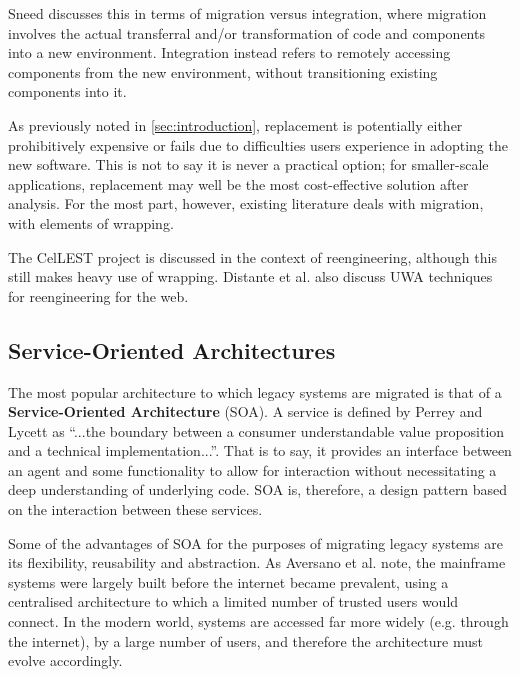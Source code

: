\documentclass[12pt,journal,compsoc]{IEEEtran}
\begin{document}
Sneed\cite{Sneed2009} discusses this in terms of migration versus integration, where migration involves the actual transferral and/or transformation of code and components into a new environment. Integration instead refers to remotely accessing components from the new environment, without transitioning existing components into it.

As previously noted in \ref{sec:introduction}, replacement is potentially either prohibitively expensive\cite{Duncan1996} or fails due to difficulties users experience in adopting the new software\cite{Sneed2011}. This is not to say it is never a practical option; for smaller-scale applications, replacement may well be the most cost-effective solution after analysis. For the most part, however, existing literature deals with migration\cite{Aversano2001,Bodhuin2002,Canfora2006,Canfora2000,Canfora2008,Lucia1997,Lewis2006,Sneed2011,Sneed2008,Sneed2009,Sneed2013,Wu2005,Sneed1996,Duncan1996}, with elements of wrapping\cite{Chiang2001,Canfora2008,Sneed1996,Sneed2003}.

The CelLEST project\cite{Stroulia2002} is discussed in the context of reengineering, although this still makes heavy use of wrapping. Distante et al.\cite{Distante2006} also discuss UWA techniques for reengineering for the web.

\subsection{Service-Oriented Architectures}
\label{subsec:soa}
The most popular architecture to which legacy systems are migrated is that of a \textbf{Service-Oriented Architecture} (SOA)\cite{Sneed2008,Almonaies2010,Koschel2009,Canfora2006,Sneed2009,Canfora2008}. A service is defined by Perrey and Lycett\cite{Perrey2003} as ``...the boundary between a consumer understandable value proposition and a technical implementation...''. That is to say, it provides an interface between an agent and some functionality to allow for interaction without necessitating a deep understanding of underlying code. SOA is, therefore, a design pattern based on the interaction between these services.

Some of the advantages of SOA for the purposes of migrating legacy systems are its flexibility, reusability and abstraction\cite{Almonaies2010}. As Aversano et al. note\cite{Aversano2001}, the mainframe systems were largely built before the internet became prevalent, using a centralised architecture to which a limited number of trusted users would connect. In the modern world, systems are accessed far more widely (e.g. through the internet), by a large number of users, and therefore the architecture must evolve accordingly.
\end{document}
